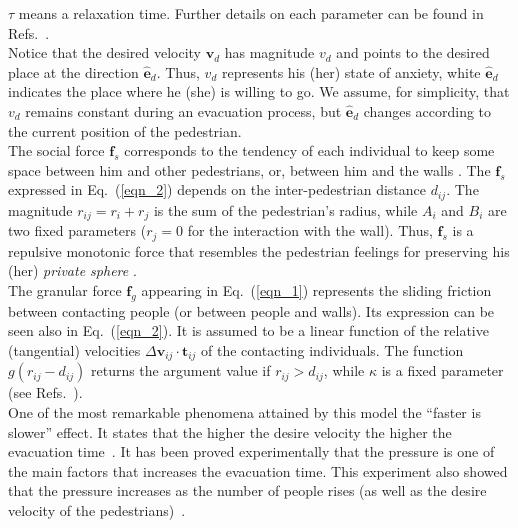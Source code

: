 $\tau$ means a relaxation time. Further details on each parameter can be found 
in Refs.~\cite{Helbing1,Dorso1,Dorso2,Dorso3,Dorso4}.\\

Notice that the desired velocity $\mathbf{v}_d$ has magnitude $v_d$ and points 
to the desired place at the direction $\hat{\mathbf{e}}_d$. Thus, $v_d$ 
represents his (her) state of anxiety, white $\hat{\mathbf{e}}_d$ indicates the 
place where he (she) is willing to go. We assume, for simplicity, that 
$v_d$ remains constant during an evacuation process, but $\hat{\mathbf{e}}_d$ 
changes according to the current position of the pedestrian.   \\

The social force $\mathbf{f}_s$ corresponds to the tendency of each individual 
to keep some space between him and other pedestrians, or, between him and the 
walls \cite{Helbing4}. The $\mathbf{f}_s$ expressed in Eq.~(\ref{eqn_2}) 
depends on the inter-pedestrian distance $d_{ij}$. The magnitude 
$r_{ij}=r_i+r_j$ is the sum of the pedestrian's radius, while $A_i$ and $B_i$ 
are two fixed parameters ($r_j=0$ for the interaction with the wall). Thus, 
$\mathbf{f}_s$ is a repulsive monotonic force that resembles the pedestrian 
feelings for preserving his (her) \textit{private sphere} 
\cite{Helbing1,Helbing4}. \\

The granular force $\mathbf{f}_g$ appearing in Eq.~(\ref{eqn_1}) represents the 
sliding friction between contacting people (or between people  and walls). Its 
expression can be seen also in Eq.~(\ref{eqn_2}). It is assumed to be a linear 
function of the relative (tangential) velocities $\Delta
\mathbf{v}_{ij}\cdot\mathbf{t}_{ij}$ of the contacting individuals. The 
function $g(r_{ij}-d_{ij})$ returns the argument value if $r_{ij}>d_{ij}$, 
while $\kappa$ is a fixed parameter (see 
Refs.~\cite{Helbing1,Dorso1,Dorso2,Dorso3,Dorso4}).\\

{\color{red} One of the most remarkable phenomena attained by this model the ``faster is slower'' effect. It states that the higher the desire velocity the higher the evacuation time~\cite{Helbing1}. It has been proved experimentally that the pressure is one of the main factors that increases the evacuation time. This experiment also showed that the pressure increases as the number of people rises (as well as the desire velocity of the pedestrians)~\cite{Pastor}.}  
 



